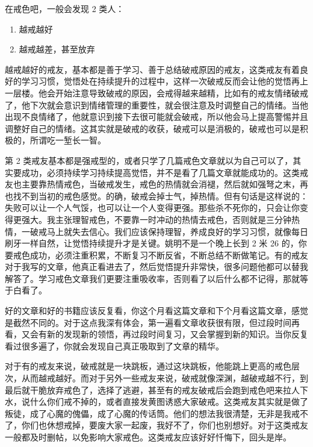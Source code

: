 \documentclass[fontset=founder]{ctexart}
\begin{document}
在戒色吧，一般会发现 2 类人：

\begin{multicols}{2}
    \begin{enumerate}
        \item 越戒越好
        \item 越戒越差，甚至放弃
    \end{enumerate}
\end{multicols}

越戒越好的戒友，基本都是善于学习、善于总结破戒原因的戒友，这类戒友有着良好的学习习惯，觉悟处在持续提升的过程中，这样一次破戒反而会让他的觉悟再上一层楼。他会开始注意导致破戒的原因，会戒得越来越精，比如有的戒友情绪破戒了，他下次就会意识到情绪管理的重要性，就会很注意及时调整自己的情绪。当他出现不良情绪了，他就意识到接下去很可能就会破戒，所以他会马上提高警惕并且调整好自己的情绪。这其实就是破戒的收获，破戒可以是消极的，破戒也可以是积极的，所谓吃一堑长一智。

第 2 类戒友基本都是强戒型的，或者只学了几篇戒色文章就以为自己可以了，其实要成功，必须持续学习持续提高觉悟，并不是看了几篇文章就能成功的。这类戒友也主要靠热情戒色，当破戒发生，戒色的热情就会消褪，然后就如强弩之末，再也找不到当初的戒色感觉。的确，破戒会掉士气，掉热情。但有句话是这样说的：失败可以让一个人气馁，也可以让一个人变得更强。那些杀不死你的，只会让你变得更强大。我主张理智戒色，不要靠一时冲动的热情去戒色，否则就是三分钟热情，一破戒马上就失去信心。我们应该保持理智，养成良好的学习习惯，就像每日刷牙一样自然，让觉悟持续提升才是关键。姚明不是一个晚上长到 2 米 26 的，你要戒色成功，必须注重积累，不断复习不断反省，不断总结不断做笔记。有的戒友对于我写的文章，他真正看进去了，然后觉悟提升非常快，很多问题他都可以替我解答了。学习戒色文章我们更要注重吸收率，否则看了以后什么都不记得，那就等于白看了。

好的文章和好的书籍应该反复看，你这个月看这篇文章和下个月看这篇文章，感觉是截然不同的。对于这点我深有体会，第一遍看文章收获很有限，但过段时间再看，又会有新的发现新的领悟，再过段时间复习，又会掌握到新的知识。当你反复看过很多遍了，你就会发现自己真正吸取到了文章的精华。

对于有的戒友来说，破戒就是一块跳板，通过这块跳板，他能跳上更高的戒色层次，从而越戒越好。而对于另外一些戒友来说，破戒就像深渊，越破戒越不行，到最后就干脆放弃戒色了，选择了逃避，甚至有的戒友破戒后会跑到戒色吧来拉人下水，说什么你们戒不掉的，或者直接发黄图诱惑大家破戒。这类戒友其实就是做了叛徒，成了心魔的傀儡，成了心魔的传话筒。他们的想法我很清楚，无非是我戒不了，你们也休想戒掉，要废大家一起废，我好不了，你们也别想好。对于这类戒友一般都及时删帖，以免影响大家戒色。这类戒友应该好好忏悔下，回头是岸。
\end{document}
